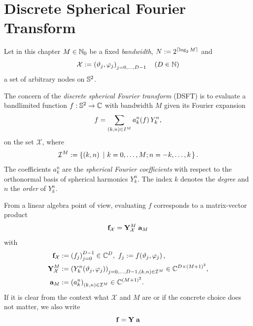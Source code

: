 \chapter{Discrete Spherical Fourier Transform}
\label{DSFT}
Let in this chapter $M \in \mathbb{N}_{0}$ be a fixed \emph{bandwidth}, $N := 2^{\left\lceil\log_2 M\right\rceil}$ 
and 
$$\mathcal{X} := \left(\vartheta_j,\varphi_j\right)_{j=0,\ldots,D-1} \quad \left(D \in \mathbb{N}\right)$$ 
a set of arbitrary nodes on $\mathbb{S}^2$.

The concern of the \emph{discrete spherical Fourier transform} (DSFT)  
is to evaluate a bandlimited function $f: \mathbb{S}^2 \rightarrow \mathbb{C}$ with bandwidth $M$ given its Fourier expansion
\begin{equation}
  \label{NFSFT:FourierExpansion} 
  f = \sum_{\left(k,n\right) \in I^M} a_k^n{\hspace{-0.4ex}}\left(f\right) Y_{k}^n,
\end{equation}  
on the set $\mathcal{X}$, where $$\mathcal{I}^M := \left\{\left(k,n\right)\ \left|\ k=0,\ldots,M;n=-k,\ldots,k\right.\right\rbrace.$$
The coefficients $a_k^n$ are the \emph{spherical Fourier coefficients} 
with respect to the orthonormal basis of spherical harmonics $Y_{k}^n$. The index $k$ denotes the \emph{degree} and $n$ 
the \emph{order} of $Y_{k}^n$. 

From a linear algebra point of view, evaluating $f$ corresponds to a matrix-vector product
$$ \mathbf{f}_{\mathcal{X}} = \mathbf{Y}_{\mathcal{X}}^M \; \mathbf{a}_{M}$$
with
\begin{equation}
  \nonumber
  \begin{split}
    \V{f}_{\mathcal{X}} & := \paren{f_j}_{j=0}^{D-1} \in \C^{D},\ f_{j} := \fun{f}{\vtheta_{j},\vphi_{j}},\\
    \V{Y}_{\mathcal{X}}^M & := \paren{\fun{Y_k^n}{\vtheta_j,\vphi_j}}_{j=0,\ldots,D-1, \paren{k,n} \in \mathcal{I}^M} \in \C^{D \times \paren{M+1}^2},\\
    \V{a}_{M} & := \paren{a_k^n}_{\paren{k,n} \in \mathcal{I}^M} \in \C^{\paren{M+1}^2}.
  \end{split}
\end{equation}
If it is clear from the context what $\mathcal{X}$ and $M$ are or if the concrete choice does not matter, we also write 
$$ \mathbf{f} = \mathbf{Y} \; \mathbf{a}$$

